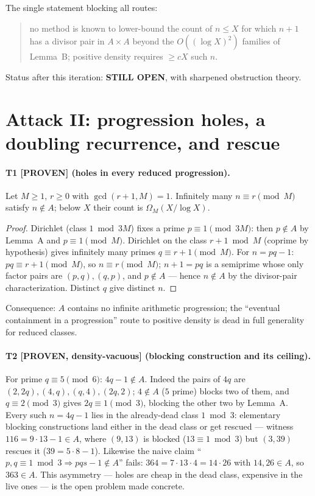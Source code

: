 \documentclass[11pt]{article}
\theoremstyle{definition}
\newcommand{\A}{A}
\begin{document}
The single statement blocking all routes:
\begin{quote}
no method is known to lower-bound the count of $n\le X$ for which $n+1$ has a
divisor pair in $\A\times\A$ beyond the $O((\log X)^2)$ families of
Lemma~B; positive density requires $\ge cX$ such $n$.
\end{quote}
Status after this iteration: \textbf{STILL OPEN}, with sharpened obstruction
theory.

\section{Attack II: progression holes, a doubling recurrence, and rescue}\label{sec:attack2}

\paragraph{T1 [PROVEN] (holes in every reduced progression).}
Let $M\ge1$, $r\ge0$ with $\gcd(r+1,M)=1$. Infinitely many $n\equiv r\pmod M$
satisfy $n\notin\A$; below $X$ their count is $\Omega_M(X/\log X)$.
\begin{proof}
Dirichlet (class $1\bmod 3M$) fixes a prime $p\equiv1\pmod{3M}$: then
$p\notin\A$ by Lemma~A and $p\equiv1\pmod M$. Dirichlet on the class
$r+1\bmod M$ (coprime by hypothesis) gives infinitely many primes
$q\equiv r+1\pmod M$. For $n=pq-1$: $pq\equiv r+1\pmod M$, so
$n\equiv r\pmod M$; $n+1=pq$ is a semiprime whose only factor pairs are
$(p,q),(q,p)$, and $p\notin\A$ --- hence $n\notin\A$ by the divisor-pair
characterization. Distinct $q$ give distinct $n$.
\end{proof}
Consequence: $\A$ contains no infinite arithmetic progression; the
``eventual containment in a progression'' route to positive density is dead
in full generality for reduced classes.

\paragraph{T2 [PROVEN, density-vacuous] (blocking construction and its ceiling).}
For prime $q\equiv5\pmod6$: $4q-1\notin\A$. Indeed the pairs of $4q$ are
$(2,2q),(4,q),(q,4),(2q,2)$; $4\notin\A$ ($5$ prime) blocks two of them, and
$q\equiv2\pmod3$ gives $2q\equiv1\pmod3$, blocking the other two by Lemma~A.
Every such $n=4q-1$ lies in the already-dead class $1\bmod3$: elementary
blocking constructions land either in the dead class or get rescued ---
witness $116=9\cdot13-1\in\A$, where $(9,13)$ is blocked ($13\equiv1\bmod3$)
but $(3,39)$ rescues it ($39=5\cdot8-1$). Likewise the naive claim
``$p,q\equiv1\bmod3 \Rightarrow pqs-1\notin\A$'' fails:
$364=7\cdot13\cdot4=14\cdot26$ with $14,26\in\A$, so $363\in\A$. This
asymmetry --- holes are cheap in the dead class, expensive in the live ones
--- is the open problem made concrete.
\end{document}
